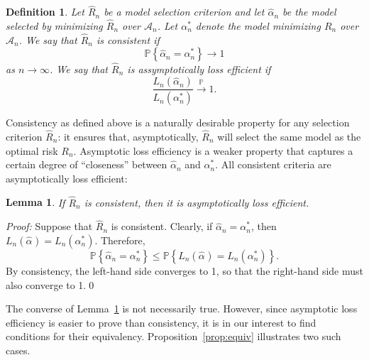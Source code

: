 \documentclass[11pt, letter paper]{article}
\newcommand{\1}{\mathmybb{1}}
\newtheorem{definition}{Definition}[section]
\newtheorem{lemma}[proposition]{Lemma}
\newcommand{\0}{\emptyset}
\newcommand{\prob}{\mathbb{P}}
\newcommand{\paren}[1]{\left(#1 \right)}
\newcommand{\set}[1]{\left\{ #1 \right\}}
\newcommand{\Acal}{\mathcal{A}_{n}}
\newcommand{\Loss}[1]{L_{n}\paren{#1}}
\newcommand{\alphahat}[1]{\hat{\alpha}^{#1}}
\begin{document}
\begin{definition}\label{def:consistency97}
    Let \(\hat{R}_{n}\) be a model selection criterion and let \(\alphahat{}_{n}\) be the model selected by minimizing \(\hat{R}_{n}\) over \(\Acal\). Let \(\alpha^{*}_{n}\) denote the model minimizing \(R_{n}\) over \(\Acal\). We say that \(\hat{R}_{n}\) is {consistent} if 
    \[\prob\set{\alphahat{}_{n} = \alpha^{*}_{n}}\to 1\]
    as \(n\to\infty\). We say that \(\hat{R}_{n}\) is {assymptotically loss efficient} if 
    \[\frac{L_{n}(\alphahat{}_{n})}{L_{n}(\alpha^{*}_{n})}\xrightarrow{\prob} 1.\]
\end{definition}

Consistency as defined above is a naturally desirable property for any selection criterion \(\hat{R}_{n}\): it ensures that, asymptotically, \(\hat{R}_{n}\) will select the same model as the optimal risk \(R_{n}\). Asymptotic loss efficiency is a weaker property that captures a certain degree of ``closeness'' between \(\alphahat{}_{n}\) and \(\alpha^{*}_{n}\). All consistent criteria are asymptotically loss efficient:

\begin{lemma}\label{lemm:implication}
    If \(\hat{R}_{n}\) is consistent, then it is asymptotically loss efficient.
\end{lemma}

\begin{myproofbox}
    \textit{Proof: }
    Suppose that \(\hat{R}_{n}\) is consistent. Clearly, if \(\alphahat{}_{n} = \alpha^{*}_{n}\), then \(\Loss{\alphahat{}} = \Loss{\alpha^{*}_{n}}\). Therefore, 
    \[\prob\set{\alphahat{}_{n} = \alpha^{*}_{n}}\leq \prob\set{\Loss{\alphahat{}} = \Loss{\alpha^{*}_{n}}}.\]
    By consistency, the left-hand side converges to 1, so that the right-hand side must also converge to 1.\qed{}
\end{myproofbox}

The converse of Lemma~\ref{lemm:implication} is not necessarily true. However, since asymptotic loss efficiency is easier to prove than consistency, it is in our interest to find conditions for their equivalency. Proposition~\ref{prop:equiv} illustrates two such cases.
\end{document}
